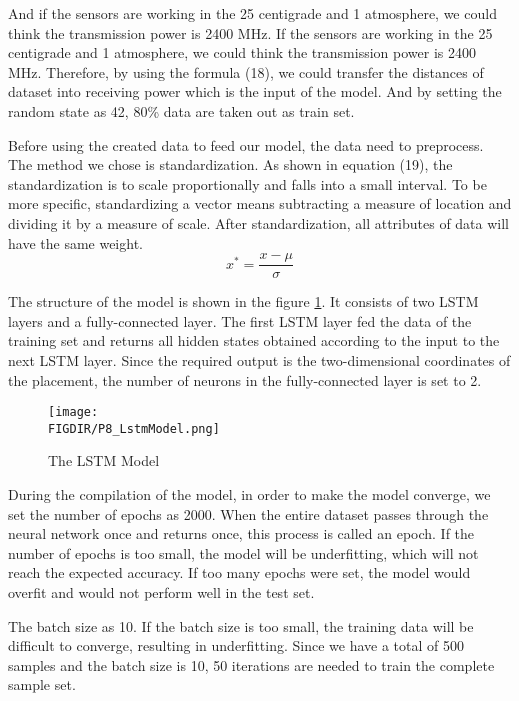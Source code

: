 And if the sensors are working in the 25 centigrade and 1 atmosphere, we could think the transmission power is 2400 MHz. If the sensors are working in the 25 centigrade and 1 atmosphere, we could think the transmission power is 2400 MHz. Therefore, by using the formula (18), we could transfer the distances of dataset into receiving power which is the input of the model. And by setting the random state as 42, 80\% data are taken out as train set.

Before using the created data to feed our model, the data need to preprocess. The method we chose is standardization. As shown in equation (19), the standardization is to scale proportionally and falls into a small interval. To be more specific, standardizing a vector means subtracting a measure of location and dividing it by a measure of scale. After standardization, all attributes of data will have the same weight.\\ 
\begin{equation}
    x^*=\frac{x-\mu}{\sigma}
\end{equation}

The structure of the model \cite{tarwani2017survey} is shown in the figure \ref{LSTM structure}. It consists of two LSTM layers and a fully-connected layer. The first LSTM layer fed the data of the training set and returns all hidden states obtained according to the input to the next LSTM layer. Since the required output is the two-dimensional coordinates of the placement, the number of neurons in the fully-connected layer is set to 2. 

\begin{figure}[ht]
\centering
\texttt{[image: \\FIGDIR/P8\_LstmModel.png]}
\caption{The LSTM Model}
\label{LSTM structure}
\end{figure}
During the compilation of the model, in order to make the model converge, we set the number of epochs as 2000. When the entire dataset passes through the neural network once and returns once, this process is called an epoch. If the number of epochs is too small, the model will be underfitting, which will not reach the expected accuracy. If too many epochs were set, the model would overfit and would not perform well in the test set.

The batch size as 10. If the batch size is too small, the training data will be difficult to converge, resulting in underfitting. Since we have a total of 500 samples and the batch size is 10, 50 iterations are needed to train the complete sample set.

